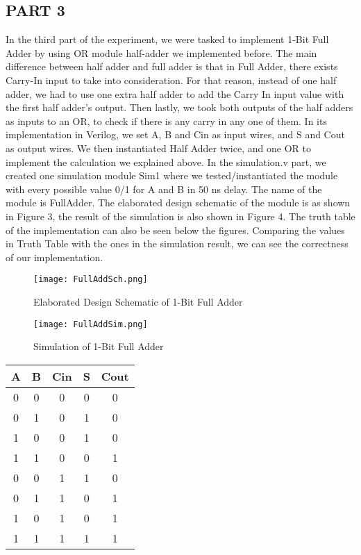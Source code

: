 \documentclass[pdftex,12pt,a4paper]{article}
\begin{document}
\newpage
\subsection{PART 3}
In the third part of the experiment, we were tasked to implement 1-Bit Full Adder by using OR module half-adder we implemented before. The main difference between half adder and full adder is that in Full Adder, there exists Carry-In input to take into consideration. For that reason, instead of one half adder, we had to use one extra half adder to add the Carry In input value with the first half adder's output. Then lastly, we took both outputs of the half adders as inputs to an OR, to check if there is any carry in any one of them. In its implementation in Verilog, we set A, B and Cin as input wires, and S and Cout as output wires. We then instantiated Half Adder twice, and one OR to implement the calculation we explained above. In the simulation.v part, we created one simulation module Sim1 where we tested/instantiated the module with every possible value 0/1 for A and B in 50 ns delay. The name of the module is FullAdder. The elaborated design schematic of the module is as shown in Figure 3, the result of the simulation is also shown in Figure 4. The truth table of the implementation can also be seen below the figures. Comparing the values in Truth Table with the ones in the simulation result, we can see the correctness of our implementation.

\begin{figure}[ht]
	\centering
	\texttt{[image: FullAddSch.png]}
	\caption{Elaborated Design Schematic of 1-Bit Full Adder}
	\label{fig1}
\end{figure}


\begin{figure}[ht]
	\centering
	\texttt{[image: FullAddSim.png]}
	\caption{Simulation of 1-Bit Full Adder}
	\label{fig1}
\end{figure}

\begin{center}
 \begin{tabular}{|c|c|c|c|c|} 
 \hline
 A & B & Cin & S & Cout  \\ 
 \hline\hline
 0 & 0 & 0 & 0 & 0\\ 
 \hline
 0 & 1 & 0 & 1 & 0\\
 \hline
 1 & 0 & 0 & 1 & 0\\
 \hline
 1 & 1 & 0 & 0 & 1\\
 \hline
 0 & 0 & 1 & 1 & 0\\
 \hline
 0 & 1 & 1 & 0 & 1\\
 \hline
 1 & 0 & 1 & 0 & 1\\
 \hline
 1 & 1 & 1 & 1 & 1\\
  \hline
\end{tabular}
\end{center}
\end{document}
